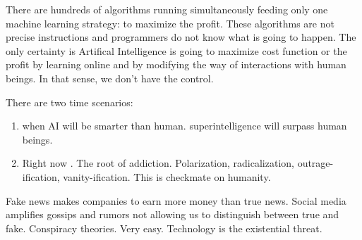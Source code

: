   
There are hundreds of algorithms running simultaneously feeding  
only one machine learning strategy: to maximize the profit.
These algorithms are not 
precise instructions and programmers do not know what is going to happen.
The only certainty is Artifical Intelligence is going to maximize 
cost function or the profit by learning online and by modifying the 
way of interactions with human beings. 
In that sense, we don't have the control. 
  
  
There are two time scenarios:  
\begin{enumerate} 
\item when AI will be smarter than human. superintelligence will surpass human beings. 
\item Right now . The root of addiction.
Polarization, radicalization, outrage-ification, vanity-ification. 
This is checkmate on humanity. 
\end{enumerate}  
  
  
  
  
Fake news makes companies to earn more money than true news. 
Social media amplifies gossips and rumors not allowing us 
to distinguish between true and fake. 
Conspiracy theories. Very easy. 
Technology is the existential threat.   
%  
%  
%  
%  
%  
%  
%  

